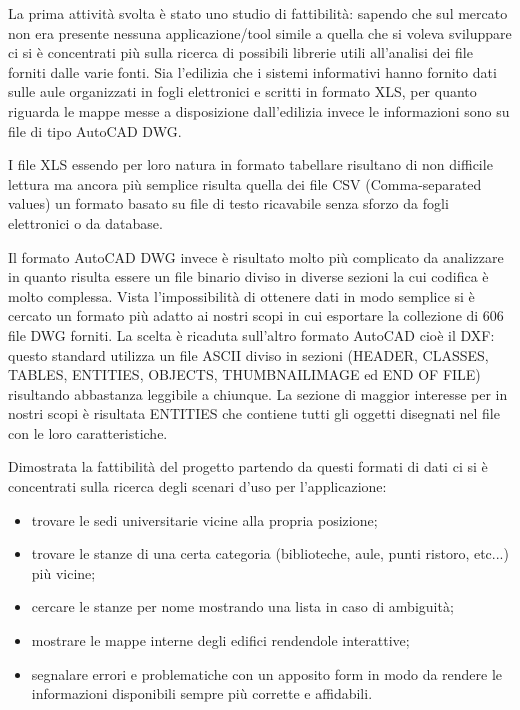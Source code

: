 \documentclass[12pt]{report}
\begin{document}
La prima attività svolta è stato uno studio di fattibilità: sapendo che sul mercato non era presente nessuna applicazione/tool simile a quella che si voleva sviluppare ci si è concentrati più sulla ricerca di possibili librerie utili all'analisi dei file forniti dalle varie fonti. 
Sia l'edilizia che i sistemi informativi hanno fornito dati sulle aule organizzati in fogli elettronici e scritti in formato XLS, per quanto riguarda le mappe messe a disposizione dall'edilizia invece le informazioni sono su file di tipo AutoCAD DWG. 

I file XLS essendo per loro natura in formato tabellare risultano di non difficile lettura ma ancora più semplice risulta quella dei file CSV (Comma-separated values) un formato basato su file di testo ricavabile senza sforzo da fogli elettronici o da database. 

Il formato AutoCAD DWG invece è risultato molto più complicato da analizzare in quanto risulta essere un file binario diviso in diverse sezioni la cui codifica è molto complessa. Vista l'impossibilità di ottenere dati in modo semplice si è cercato un formato più adatto ai nostri scopi in cui esportare la collezione di 606 file DWG forniti. La scelta è ricaduta sull'altro formato AutoCAD cioè il DXF: questo standard utilizza un file ASCII diviso in sezioni (HEADER, CLASSES, TABLES, ENTITIES, OBJECTS, THUMBNAILIMAGE ed END OF FILE) risultando abbastanza leggibile a chiunque. La sezione di maggior interesse per in nostri scopi è risultata ENTITIES che contiene tutti gli oggetti disegnati nel file con le loro caratteristiche.

Dimostrata la fattibilità del progetto partendo da questi formati di dati ci si è concentrati sulla ricerca degli scenari d'uso per l'applicazione:        
\begin{itemize}
\item trovare le sedi universitarie vicine alla propria posizione;
\item trovare le stanze di una certa categoria (biblioteche, aule, punti ristoro, etc...) più vicine;
\item cercare le stanze per nome mostrando una lista in caso di ambiguità;
\item mostrare le mappe interne degli edifici rendendole interattive;
\item segnalare errori e problematiche con un apposito form in modo da rendere le informazioni disponibili sempre più corrette e affidabili.
\end{itemize}
\end{document}
